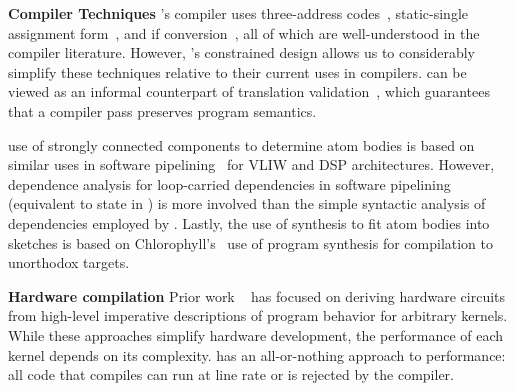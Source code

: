 \textbf{Compiler Techniques}
\pktlanguage's compiler uses three-address codes~\cite{tac}, static-single
assignment form~\cite{ssa}, and if conversion~\cite{if_conversion}, all of
which are well-understood in the compiler literature. However, \pktlanguage's
constrained design allows us to considerably simplify these techniques relative
to their current uses in compilers. \tester can be viewed as an informal
counterpart of translation validation~\cite{necula_translation_validation},
which guarantees that a compiler pass preserves program semantics.

\pktlanguage use of strongly connected components to determine atom bodies is
based on similar uses in software pipelining~\cite{software_pipelining} for
VLIW and DSP architectures. However, dependence analysis for loop-carried
dependencies in software pipelining (equivalent to state in \pktlanguage) is
more involved than the simple syntactic analysis of dependencies employed by
\pktlanguage. Lastly, the use of synthesis to fit atom bodies into sketches is
based on Chlorophyll's~\cite{chlorophyll} use of program synthesis for
compilation to unorthodox targets.

\textbf{Hardware compilation}
Prior work ~\cite{nurvadathi, cash, bluespec} has focused on deriving hardware
circuits from high-level imperative descriptions of program behavior for
arbitrary kernels. While these approaches simplify hardware development, the
performance of each kernel depends on its complexity.  \pktlanguage has an
all-or-nothing approach to performance: all code that compiles can run at
line rate or is rejected by the compiler.
